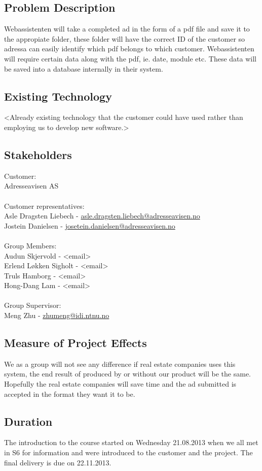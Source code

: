 \subsection{Problem Description}
Webassistenten will take a completed ad in the form of a pdf file and save it to the appropiate folder, these folder will have the correct ID of the customer so adressa can easily identify which pdf belongs to which customer.
Webassistenten will require certain data along with the pdf, ie. date, module etc. These data will be saved into a database internally in their system.

\subsection{Existing Technology}
<Already existing technology that the customer could have used rather than employing us to develop new software.>

\subsection{Stakeholders}
Customer:\\
Adresseavisen AS\\
\\
Customer representatives:\\
Asle Dragsten Liebech - \href{mailto://asle.dragsten.liebech@adresseavisen.no}{asle.dragsten.liebech@adresseavisen.no}\\
Jostein Danielsen - \href{mailto://josetein.danielsen@adresseavisen.no}{josetein.danielsen@adresseavisen.no}\\
\\
Group Members:\\
Audun Skjervold - <email>\\
Erlend Løkken Sigholt - <email>\\
Truls Hamborg - <email>\\
Hong-Dang Lam - <email>\\
\\
Group Supervisor:\\
Meng Zhu - \href{mailto://zhumeng@idi.ntnu.no}{zhumeng@idi.ntnu.no}
\\
\subsection{Measure of Project Effects}
We as a group will not see any difference if real estate companies uses this system, the end result of produced by or without our product will be the same. Hopefully the real estate companies will save time and the ad submitted is accepted in the format they want it to be.
\subsection{Duration}
The introduction to the course started on Wednesday 21.08.2013 when we all met in S6 for information and were introduced to the customer and the project.
The final delivery is due on 22.11.2013.
